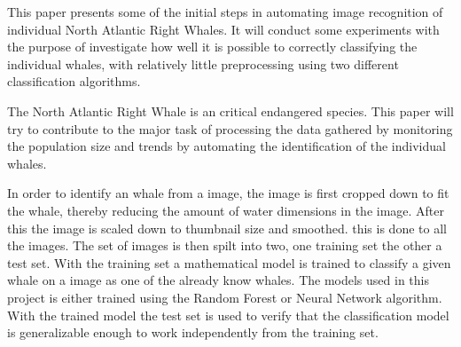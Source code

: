 This paper presents some of the initial steps in automating image recognition of individual North Atlantic Right Whales.
It will conduct some experiments with the purpose of investigate how well it is possible to correctly classifying the individual whales, with relatively little preprocessing using two different classification algorithms.

The North Atlantic Right Whale is an critical endangered species. 
This paper will try to contribute to the major task of processing the data gathered by monitoring the population size and trends by automating the identification of the individual whales.

In order to identify an whale from a image, the image is first cropped down to fit the whale, thereby reducing the amount of water dimensions in the image. After this the image is scaled down to thumbnail size and smoothed. this is done to all the images. The set of images is then spilt into two, one training set the other a test set.
With the training set a mathematical model is trained to classify a given whale on a image as one of the already know whales.
The models used in this project is either trained using the Random Forest or Neural Network algorithm.
With the trained model the test set is used to verify that the classification model is generalizable enough to work independently from the training set.